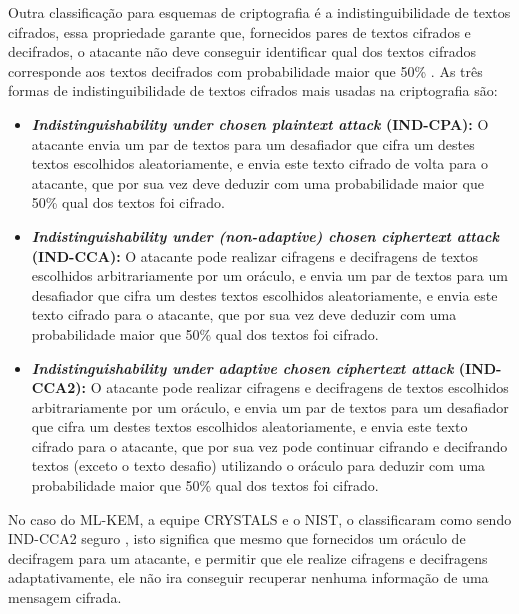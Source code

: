     Outra classificação para esquemas de criptografia é a indistinguibilidade de textos cifrados, essa propriedade garante que, fornecidos pares de textos cifrados e decifrados, o atacante não deve conseguir identificar qual dos textos cifrados corresponde aos textos decifrados com probabilidade maior que 50\% \cite{introduction_to_modern_cryptography}. As três formas de indistinguibilidade de textos cifrados mais usadas na criptografia são:

    \begin{itemize}
        \item \textbf{\textit{Indistinguishability under chosen plaintext attack} (IND-CPA): } O atacante envia um par de textos para um desafiador que cifra um destes textos escolhidos aleatoriamente, e envia este texto cifrado de volta para o atacante, que por sua vez deve deduzir com uma probabilidade maior que 50\% qual dos textos foi cifrado.
        \item \textbf{\textit{Indistinguishability under (non-adaptive) chosen ciphertext attack} (IND-CCA): } O atacante pode realizar cifragens e decifragens de textos escolhidos arbitrariamente por um oráculo, e envia um par de textos para um desafiador que cifra um destes textos escolhidos aleatoriamente, e envia este texto cifrado para o atacante, que por sua vez deve deduzir com uma probabilidade maior que 50\% qual dos textos foi cifrado.
        \item \textbf{\textit{Indistinguishability under adaptive chosen ciphertext attack} (IND-CCA2): } O atacante pode realizar cifragens e decifragens de textos escolhidos arbitrariamente por um oráculo, e envia um par de textos para um desafiador que cifra um destes textos escolhidos aleatoriamente, e envia este texto cifrado para o atacante, que por sua vez pode continuar cifrando e decifrando textos (exceto o texto desafio) utilizando o oráculo para deduzir com uma probabilidade maior que 50\% qual dos textos foi cifrado. 
    \end{itemize}

    No caso do \ac{ML-KEM}, a equipe \ac{CRYSTALS} e o \ac{NIST}, o classificaram como sendo IND-CCA2 seguro \cite{kyber2}, isto significa que mesmo que fornecidos um oráculo de decifragem para um atacante, e permitir que ele realize cifragens e decifragens adaptativamente, ele não ira conseguir recuperar nenhuma informação de uma mensagem cifrada.
    
